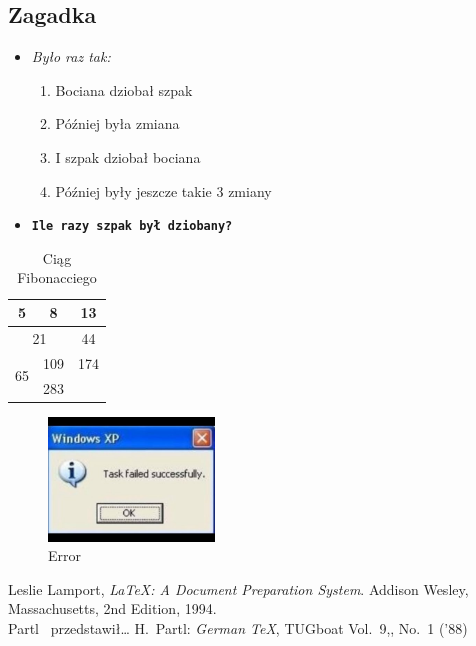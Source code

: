 \documentclass{article}
\begin{document}
\subsection{Zagadka}
\begin{itemize}
  \item \emph{Było raz tak:}
  \begin{enumerate}
    \item Bociana dziobał szpak
    \item Później była zmiana
    \item I szpak dziobał bociana
    \item Później były jeszcze takie 3 zmiany
  \end{enumerate}
  \item \textbf{\texttt{Ile razy szpak był dziobany?}}
\end{itemize}
\begin{table}[h]
\caption{Ciąg Fibonacciego}
\begin{center}
\begin{tabular}{|c|c|c|}
\hline
5 & 8 & 13\\
\hline
\multicolumn{2}{|c|}{21}&44\\
\hline
\multirow{2}{80px}{65} &109&174 \\
\cline{2-3}
& \multicolumn{2}{|l|}{283}\\
\hline
\end{tabular}
\end{center}
\end{table}
\begin{figure}[h]
\caption{Error}
\begin{center}
\includegraphics[width=125pt]{xp.jpg}
\end{center}
\end{figure}

\newpage
\begin{thebibliography}{9}
 Leslie Lamport,
 \emph{\LaTeX: A Document Preparation System}.
 Addison Wesley, Massachusetts,
 2nd Edition,
 1994. \\
 Partl~\cite{pa} przedstawi\l \ldots
{} H.~Partl:
\emph{German \TeX},
TUGboat Vol.~9,, No.~1 ('88)
\end{thebibliography}
\end{document}
